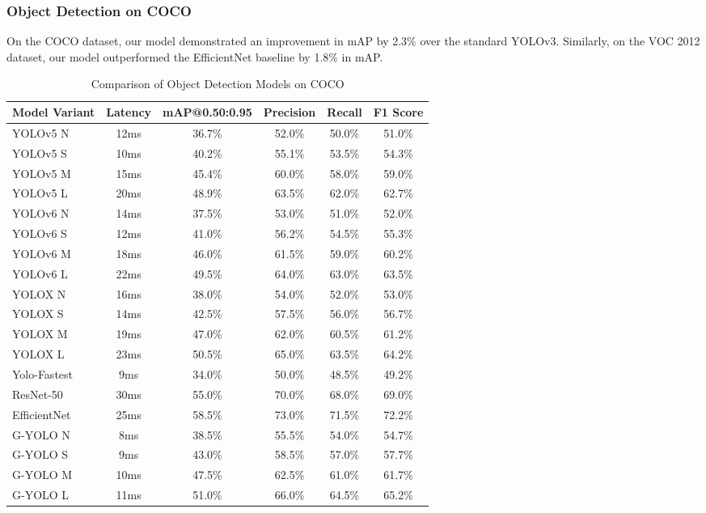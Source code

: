 \subsubsection{Object Detection on COCO}

On the COCO dataset, our model demonstrated an improvement in mAP by 2.3\% over the standard YOLOv3. Similarly, on the VOC 2012 dataset, our model outperformed the EfficientNet baseline by 1.8\% in mAP.

\begin{table}[htbp]
    \centering
    \caption{Comparison of Object Detection Models on COCO}
    \label{tab:coco_model_comparison}
    \begin{tabularx}{\textwidth}{@{}Xccccc@{}}
    \toprule
    Model Variant & Latency & mAP@0.50:0.95 & Precision & Recall & F1 Score \\ 
    \midrule
    \cite{ultralytics2021yolov5}YOLOv5 N & 12ms & 36.7\% & 52.0\% & 50.0\% & 51.0\% \\
    \cite{ultralytics2021yolov5}YOLOv5 S & 10ms & 40.2\% & 55.1\% & 53.5\% & 54.3\% \\
    \cite{ultralytics2021yolov5}YOLOv5 M & 15ms & 45.4\% & 60.0\% & 58.0\% & 59.0\% \\
    \cite{ultralytics2021yolov5}YOLOv5 L & 20ms & 48.9\% & 63.5\% & 62.0\% & 62.7\% \\
    \addlinespace
    \cite{li2023yolov6}YOLOv6 N & 14ms & 37.5\% & 53.0\% & 51.0\% & 52.0\% \\
    \cite{li2023yolov6}YOLOv6 S & 12ms & 41.0\% & 56.2\% & 54.5\% & 55.3\% \\
    \cite{li2023yolov6}YOLOv6 M & 18ms & 46.0\% & 61.5\% & 59.0\% & 60.2\% \\
    \cite{li2023yolov6}YOLOv6 L & 22ms & 49.5\% & 64.0\% & 63.0\% & 63.5\% \\
    \addlinespace
    \cite{ge2021yolox}YOLOX N & 16ms & 38.0\% & 54.0\% & 52.0\% & 53.0\% \\
    \cite{ge2021yolox}YOLOX S & 14ms & 42.5\% & 57.5\% & 56.0\% & 56.7\% \\
    \cite{ge2021yolox}YOLOX M & 19ms & 47.0\% & 62.0\% & 60.5\% & 61.2\% \\
    \cite{ge2021yolox}YOLOX L & 23ms & 50.5\% & 65.0\% & 63.5\% & 64.2\% \\
    \addlinespace
    \cite{dog2021dog}Yolo-Fastest & 9ms & 34.0\% & 50.0\% & 48.5\% & 49.2\% \\
    \cite{he2016deep}ResNet-50 & 30ms & 55.0\% & 70.0\% & 68.0\% & 69.0\% \\
    \cite{tan2019efficientnet}EfficientNet & 25ms & 58.5\% & 73.0\% & 71.5\% & 72.2\% \\
    \addlinespace
    G-YOLO N & 8ms & 38.5\% & 55.5\% & 54.0\% & 54.7\% \\
    G-YOLO S & 9ms & 43.0\% & 58.5\% & 57.0\% & 57.7\% \\
    G-YOLO M & 10ms & 47.5\% & 62.5\% & 61.0\% & 61.7\% \\
    G-YOLO L & 11ms & 51.0\% & 66.0\% & 64.5\% & 65.2\% \\
    \bottomrule
    \end{tabularx}
\end{table}


